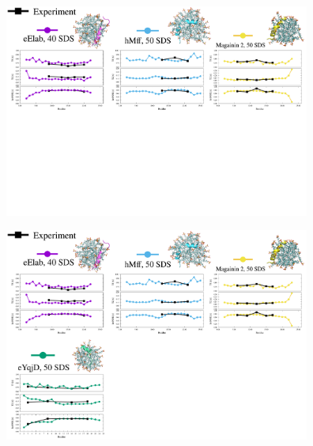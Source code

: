 \documentclass{beamer}
\begin{document}
\addtocounter{framenumber}{-1}
\begin{frame}
\begin{center}


\vspace{0.5cm}


\includegraphics[height=7cm]{all_pep6.pdf}
\end{center}
\end{frame}

\addtocounter{framenumber}{-1}
\begin{frame}
\begin{center}


\vspace{0.5cm}


\includegraphics[height=7cm]{all_pep5.pdf}
\end{center}
\end{frame}
\end{document}
